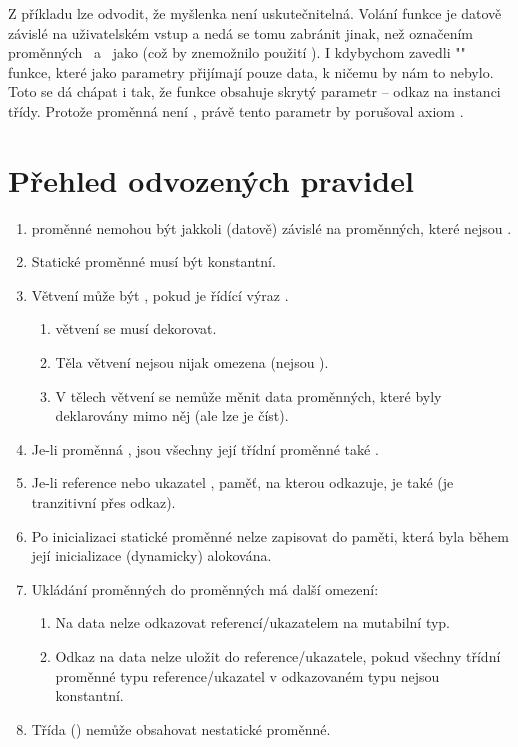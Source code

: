 Z příkladu lze odvodit, že myšlenka není uskutečnitelná. Volání funkce  je datově závislé na uživatelském vstup a nedá se tomu zabránit jinak, než označením proměnných ~a~ jako \ctime (což by znemožnilo použití ). I kdybychom zavedli "\ctimeNoXSpace" funkce, které jako parametry přijímají pouze \ctime data, k ničemu by nám to nebylo. Toto se dá chápat i tak, že funkce  obsahuje skrytý parametr -- odkaz na instanci třídy. Protože proměnná  není \ctime, právě tento parametr by porušoval axiom \ctime.

\section{Přehled odvozených pravidel} \label{ctime:rules}
\begin{enumerate}
	\item \ctime proměnné nemohou být jakkoli (datově) závislé na proměnných, které nejsou \ctime. 
	\item Statické \ctime proměnné musí být konstantní.
	\item Větvení může být \ctime, pokud je řídící výraz \ctime.
	\begin{enumerate}
		\item \ctime větvení se musí dekorovat.
		\item Těla \ctime větvení nejsou nijak omezena (nejsou \ctime).
		\item V tělech \nonctime větvení se nemůže měnit data \ctime proměnných, které byly deklarovány mimo něj (ale lze je číst).
	\end{enumerate}
	\item Je-li proměnná \ctime, jsou všechny její třídní proměnné také \ctime.
	\item Je-li reference nebo ukazatel \ctime, paměť, na kterou odkazuje, je také \ctime (\ctime je tranzitivní přes odkaz).
	\item Po inicializaci statické \ctime proměnné nelze zapisovat do paměti, která byla během její inicializace (dynamicky) alokována.
	\item Ukládání \ctime proměnných do \nonctime proměnných má další omezení:
	\begin{enumerate}
		\item Na \ctime data nelze odkazovat \nonctime referencí/ukazatelem na mutabilní typ.
		\item Odkaz na \ctime data nelze uložit do \nonctime reference/ukazatele, pokud všechny třídní proměnné typu reference/ukazatel v odkazovaném typu nejsou konstantní.
	\end{enumerate}
	\item Třída (\nonctime) nemůže obsahovat nestatické \ctime proměnné.
\end{enumerate}


